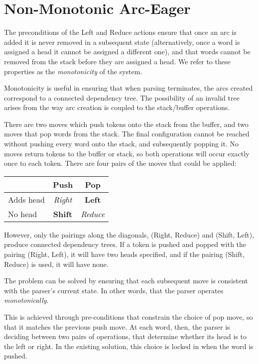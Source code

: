 \documentclass[11pt,letterpaper]{article}
\begin{document}
\section{Non-Monotonic Arc-Eager}


The preconditions of the Left and Reduce actions ensure that once an
arc is added it is never removed in a subsequent state (alternatively,
once a word is assigned a head it cannot be assigned a different one), and
that words cannot be removed from the stack before they
are assigned a head. We refer to these properties as the
\textit{monotonicity} of the system.

Monotonicity is useful in ensuring that
when parsing terminates, the arcs created correspond to a connected dependency
tree. The possibility of an invalid tree arises from the way arc creation
is coupled to the stack/buffer operations.

There are two moves which push tokens onto the stack
from the buffer, and two moves that pop words from the stack.
The final configuration cannot be reached without pushing every word
onto the stack, and subsequently popping it. No moves return tokens to the buffer or
stack, so both operations will occur exactly once to each token.
There are four pairs of the moves that could be applied:

\begin{center}
    \begin{tabular}{l|cc}
             & Push  & Pop    \\
           \hline
           Adds head   & \emph{Right} & \textbf{Left}    \\
            No head    & \textbf{Shift} & \emph{Reduce}   \\
     \end{tabular}
\end{center}


However, only the pairings along the diagonals, (Right, Reduce) and (Shift, Left),
produce connected dependency trees. If a token is pushed and popped with 
the pairing (Right, Left), it will have two heads specified, and if the pairing
(Shift, Reduce) is used, it will have none.

The problem can be solved by ensuring that each subsequent move is consistent
with the parser's current state. In other words, that the parser operates
\emph{monotonically}.

This is achieved through pre-conditions that constrain the choice of pop move,
so that it matches the previous push move.
At each word, then, the parser is deciding between two pairs of operations, that
determine whether its head is to the left or right.
In the existing solution, this choice is locked in when the word is pushed.
\end{document}
